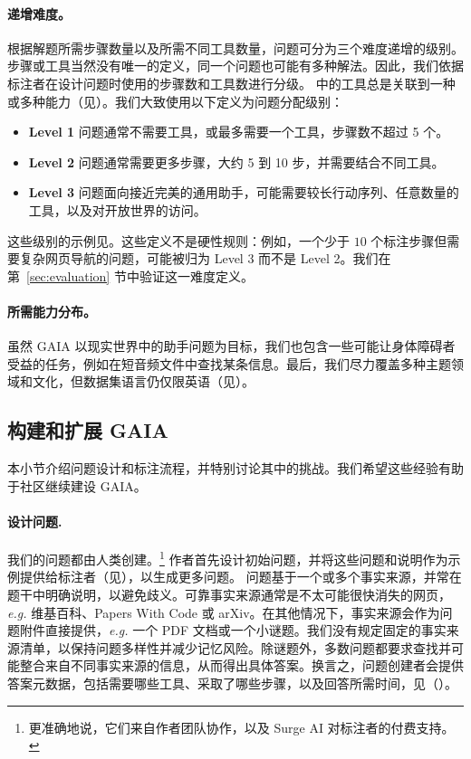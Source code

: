 \documentclass{fairmeta}
\newcommand{\benchmark}{\textsc{GAIA}}
\begin{document}
\paragraph{递增难度。} 根据解题所需步骤数量以及所需不同工具数量，问题可分为三个难度递增的级别。步骤或工具当然没有唯一的定义，同一个问题也可能有多种解法。因此，我们依据标注者在设计问题时使用的步骤数和工具数进行分级。 中的工具总是关联到一种或多种能力（见）。我们大致使用以下定义为问题分配级别：
\begin{itemize}
 \item[-] \textbf{Level 1} 问题通常不需要工具，或最多需要一个工具，步骤数不超过 5 个。
 \item[-] \textbf{Level 2} 问题通常需要更多步骤，大约 5 到 10 步，并需要结合不同工具。
 \item[-] \textbf{Level 3} 问题面向接近完美的通用助手，可能需要较长行动序列、任意数量的工具，以及对开放世界的访问。
\end{itemize}

这些级别的示例见。这些定义不是硬性规则：例如，一个少于 $10$ 个标注步骤但需要复杂网页导航的问题，可能被归为 Level 3 而不是 Level 2。我们在第~\ref{sec:evaluation} 节中验证这一难度定义。

\paragraph{所需能力分布。} 虽然 \benchmark{} 以现实世界中的助手问题为目标，我们也包含一些可能让身体障碍者受益的任务，例如在短音频文件中查找某条信息。最后，我们尽力覆盖多种主题领域和文化，但数据集语言仍仅限英语（见）。

\subsection{构建和扩展 \benchmark{}}
\label{sec:guidelines}

本小节介绍问题设计和标注流程，并特别讨论其中的挑战。我们希望这些经验有助于社区继续建设 \benchmark{}。


\paragraph{设计问题.}

我们的问题都由人类创建。\footnote{更准确地说，它们来自作者团队协作，以及 Surge AI 对标注者的付费支持。} 作者首先设计初始问题，并将这些问题和说明作为示例提供给标注者（见），以生成更多问题。
问题基于一个或多个事实来源，并常在题干中明确说明，以避免歧义。可靠事实来源通常是不太可能很快消失的网页，\textit{e.g.} 维基百科、Papers With Code 或 arXiv。在其他情况下，事实来源会作为问题附件直接提供，\textit{e.g.} 一个 PDF 文档或一个小谜题。我们没有规定固定的事实来源清单，以保持问题多样性并减少记忆风险。除谜题外，多数问题都要求查找并可能整合来自不同事实来源的信息，从而得出具体答案。换言之，问题创建者会提供答案元数据，包括需要哪些工具、采取了哪些步骤，以及回答所需时间，见（）。
\end{document}
